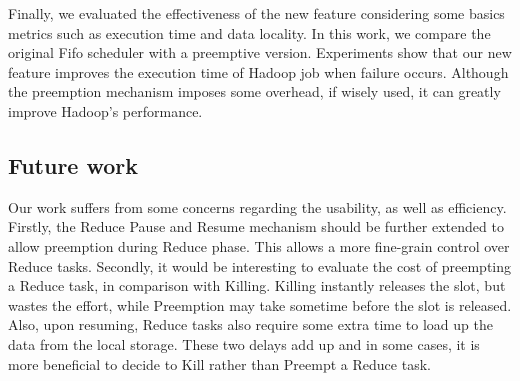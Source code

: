 \documentclass[runningheads,a4paper]{llncs}
\begin{document}
Finally, we evaluated the effectiveness of the new feature considering some basics metrics such as execution time and data locality. In this work, we compare the original Fifo scheduler with a preemptive version. Experiments show that our new feature improves the execution time of Hadoop job when failure occurs. Although the preemption mechanism imposes some overhead, if wisely used, it can greatly improve Hadoop's performance.

\subsection*{Future work}
Our work suffers from some concerns regarding the usability, as well as efficiency. Firstly, the Reduce Pause and Resume mechanism should be further extended to allow preemption during Reduce phase. This allows a more fine-grain control over Reduce tasks. Secondly, it would be interesting to evaluate the cost of preempting a Reduce task, in comparison with Killing. Killing instantly releases the slot, but wastes the effort, while Preemption may take sometime before the slot is released. Also, upon resuming, Reduce tasks also require some extra time to load up the data from the local storage. These two delays add up and in some cases, it is more beneficial to decide to Kill rather than Preempt a Reduce task.


\end{document}
